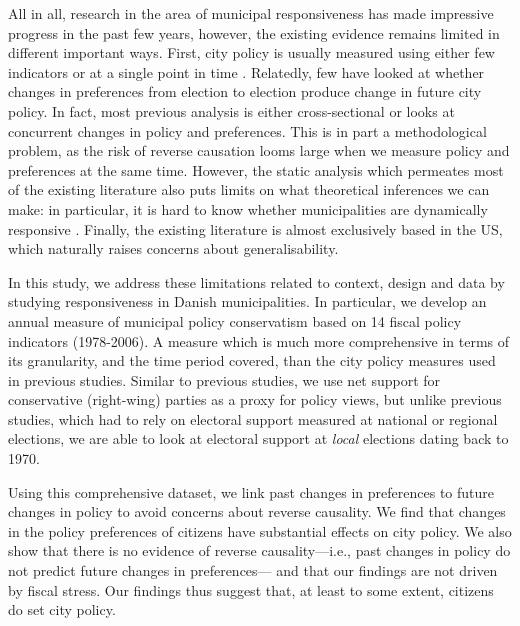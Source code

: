 \documentclass[a4paper,12pt]{article}
\begin{document}
All in all, research in the area of municipal responsiveness has made impressive progress in the past few years, however, the existing evidence remains limited in different important ways. First, city policy is usually measured using either few indicators \citep{sances2017voters,einstein2016pushing} or at a single point in time \citep{tausanovitch2014representation}. Relatedly, few have looked at whether changes in preferences from election to election produce change in future city policy. In fact, most previous analysis is either cross-sectional or looks at concurrent changes in policy and preferences. This is in part a methodological problem, as the risk of reverse causation looms large when we measure policy and preferences at the same time. However, the static analysis which permeates most of the existing literature also puts limits on what theoretical inferences we can make: in particular, it is hard to know whether municipalities are dynamically responsive \citep{stimson1995dynamic}. Finally, the existing literature is almost exclusively based in the US, which naturally raises concerns about generalisability.


In this study, we address these limitations related to context, design and data by studying responsiveness in Danish municipalities. In particular, we develop an annual measure of municipal policy conservatism based on 14 fiscal policy indicators (1978-2006). A measure which is much more comprehensive in terms of its granularity, and the time period covered, than the city policy measures used in previous studies. Similar to previous studies, we use net support for conservative (right-wing) parties as a proxy for policy views, but unlike previous studies, which had to rely on electoral support measured at national or regional elections, we are able to look at electoral support at \textit{local} elections dating back to 1970. 

Using this comprehensive dataset, we link past changes in preferences to future changes in policy to avoid concerns about reverse causality. We find that changes in the policy preferences of citizens have substantial effects on city policy. We also show that there is no evidence of reverse causality---i.e., past changes in policy do not predict future changes in preferences--- and that our findings are not driven by  fiscal stress. Our findings thus suggest that, at least to some extent, citizens do set city policy.

\end{document}
